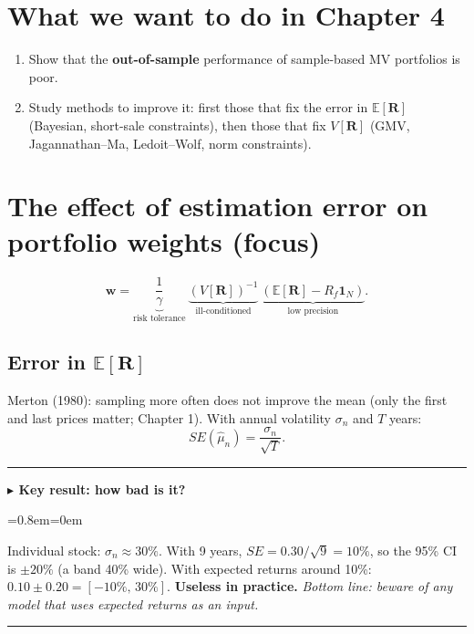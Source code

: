 \documentclass[11pt,a4paper]{report}
\newenvironment{notebox}[1]
  {\par\medskip\Needspace{6\baselineskip}\noindent\rule{\linewidth}{0.4pt}\par\nopagebreak
   \noindent\textbf{#1}\par\nopagebreak
   \begin{list}{}{\leftmargin=0.8em\rightmargin=0em\topsep=2pt}\item[]}
  {\end{list}\nopagebreak\noindent\rule{\linewidth}{0.4pt}\par\medskip}
\newenvironment{keybox}[1][]{\begin{notebox}{$\blacktriangleright$ Key result#1}}{\end{notebox}}
\newcommand{\E}{\mathbb{E}}
\newcommand{\one}{\mathbf{1}_N}
\newcommand{\w}{\bm{w}}
\newcommand{\R}{\bm{R}}
\begin{document}
\section{What we want to do in Chapter 4}
\begin{enumerate}
  \item Show that the \textbf{out-of-sample} performance of sample-based MV portfolios is poor.
  \item Study methods to improve it: first those that fix the error in $\E[\R]$
    (Bayesian, short-sale constraints), then those that fix $V[\R]$ (GMV,
    Jagannathan--Ma, Ledoit--Wolf, norm constraints).
\end{enumerate}

\section{The effect of estimation error on portfolio weights (focus)}
\[
\w=\underbrace{\frac1\gamma}_{\text{risk tolerance}}\ \underbrace{(V[\R])^{-1}}_{\text{ill-conditioned}}\ \underbrace{(\E[\R]-R_f\one)}_{\text{low precision}} .
\]

\subsection{Error in $\E[\R]$}
Merton (1980): sampling more often does not improve the mean (only the first and
last prices matter; Chapter 1). With annual volatility $\sigma_n$ and $T$ years:
\[
SE(\hat\mu_n)=\frac{\sigma_n}{\sqrt T}.
\]
\begin{keybox}[: how bad is it?]
Individual stock: $\sigma_n\approx30\%$. With 9 years, $SE=0.30/\sqrt9=10\%$, so the
95\% CI is $\pm20\%$ (a band 40\% wide). With expected returns around 10\%:
$0.10\pm0.20=[-10\%,\,30\%]$. \textbf{Useless in practice.}
\emph{Bottom line: beware of any model that uses expected returns as an input.}
\end{keybox}
\end{document}
